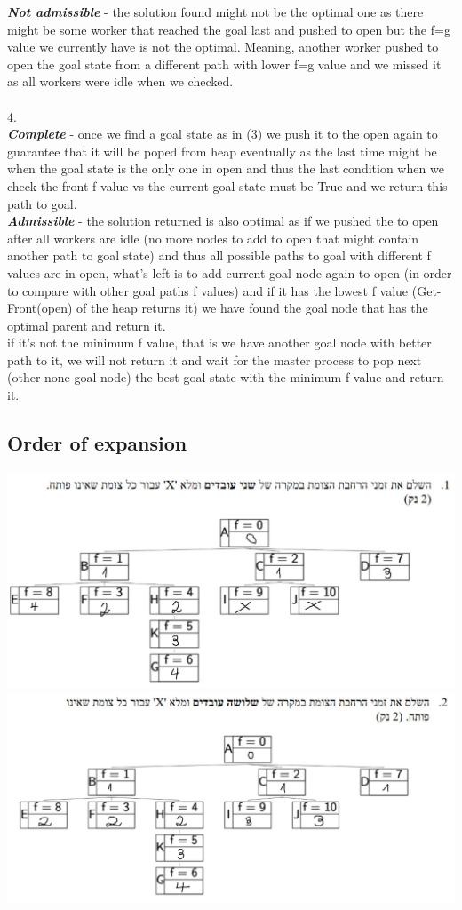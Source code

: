 \documentclass[12pt]{article}
\begin{document}
{\textit{\textbf{Not admissible}}} - the solution found might not be the optimal one as there might be some worker that reached the goal last and pushed to open but the f=g value we currently have is not the optimal. Meaning, another worker pushed to open the goal state from a different path with lower f=g value and we missed it as all workers were idle when we checked.\\
\\
4.\\

{\textit{\textbf{Complete}}} - once we find a goal state as in (3) we push it to the open again to guarantee that it will be poped from heap eventually as the last time might be when the goal state is the only one in open and thus the last condition when we check the front f value vs the current goal state must be True and we return this path to goal.\\

{\textit{\textbf{Admissible}}} - the solution returned is also optimal as if we pushed the to open after all workers are idle (no more nodes to add to open that might contain another path to goal state) and thus all possible paths to goal with different f values are in open, what's left is to add current goal node again to open (in order to compare with other goal paths f values) and if it has the lowest f value (Get-Front(open) of the heap returns it) we have found the goal node that has the optimal parent and return it.\\ if it's not the minimum f value, that is we have another goal node with better path to it, we will not return it and wait for the master process to pop next (other none goal node) the best goal state with the minimum f value and return it.

\subsection{Order of expansion}

\includegraphics[scale=0.5]{hw1/q_test_1.JPG}\\

\includegraphics[scale=0.5]{hw1/q_test_2.JPG}\\
   
\end{document}
